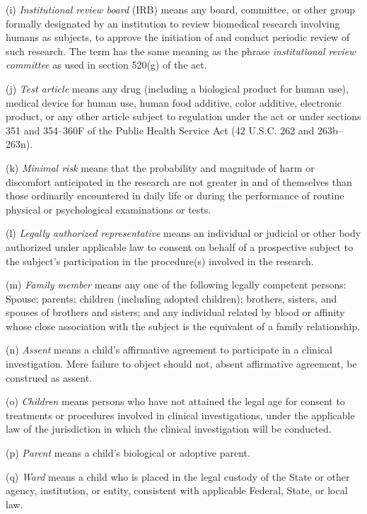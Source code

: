 \documentclass[11pt]{article}
\begin{document}
(i) \textit{Institutional review board} (IRB) means any board, committee, or other group formally designated by an institution to review biomedical research involving humans as subjects, to approve the initiation of and conduct periodic review of such research. The term has the same meaning as the phrase \textit{institutional review committee} as used in section 520(g) of the act.

(j) \textit{Test article} means any drug (including a biological product for human use), medical device for human use, human food additive, color additive, electronic product, or any other article subject to regulation under the act or under sections 351 and 354--360F of the Public Health Service Act (42 U.S.C. 262 and 263b--263n).

(k) \textit{Minimal risk} means that the probability and magnitude of harm or discomfort anticipated in the research are not greater in and of themselves than those ordinarily encountered in daily life or during the performance of routine physical or psychological examinations or tests.

(l) \textit{Legally authorized representative} means an individual or judicial or other body authorized under applicable law to consent on behalf of a prospective subject to the subject's participation in the procedure(s) involved in the research.

(m) \textit{Family member} means any one of the following legally competent persons: Spouse; parents; children (including adopted children); brothers, sisters, and spouses of brothers and sisters; and any individual related by blood or affinity whose close association with the subject is the equivalent of a family relationship.

(n) \textit{Assent} means a child's affirmative agreement to participate in a clinical investigation. Mere failure to object should not, absent affirmative agreement, be construed as assent.

(o) \textit{Children} means persons who have not attained the legal age for consent to treatments or procedures involved in clinical investigations, under the applicable law of the jurisdiction in which the clinical investigation will be conducted.

(p) \textit{Parent} means a child's biological or adoptive parent.

(q) \textit{Ward} means a child who is placed in the legal custody of the State or other agency, institution, or entity, consistent with applicable Federal, State, or local law.
\end{document}
